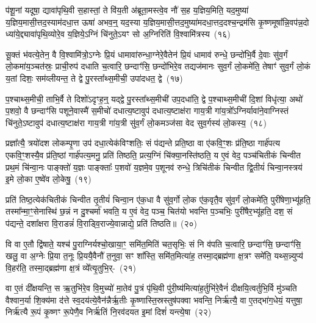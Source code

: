 प॑शू॒नां यदूषा॒ द्यावा॑\-पृथि॒वी स॒हास्तां॒ ते वि॑य॒ती अ॑ब्रूता॒मस्त्वे॒व नौ॑ स॒ह य॒ज्ञिय॒मिति॒ यद॒मुष्या॑ य॒ज्ञिय॒मासी॒त्तद॒\-स्याम॑दधा॒त्त ऊषा॑ अभव॒न्॒ यद॒स्या य॒ज्ञिय॒मासी॒त्तद॒मुष्या॑\-मदधा॒त्तद॒\-दश्च॒न्द्रम॑सि कृ॒ष्णमूषा᳚न्नि॒वप॑न्न॒दो ध्या॑ये॒द्द्यावा॑पृथि॒व्योरे॒व य॒ज्ञिये॒\-ऽग्निं चि॑नुते॒\-ऽयꣳ सो अ॒ग्निरिति॑ वि॒श्वामि॑त्रस्य~(१६)\ip

सू॒क्तं भ॑वत्ये॒तेन॒ वै वि॒श्वामि॑त्रो॒\-ऽग्नेः प्रि॒यं धामावा॑रुन्धा॒ग्नेरे॒वैतेन॑ प्रि॒यं धामाव॑ रुन्धे॒ छन्दो॑भि॒र्वै दे॒वाः सु॑व॒र्गं लो॒कमा॑य॒ञ्चत॑स्रः॒ प्राची॒रुप॑ दधाति च॒त्वारि॒ छन्दाꣳ॑सि॒ छन्दो॑भिरे॒व तद्यज॑मानः सुव॒र्गं लो॒कमे॑ति॒ तेषाꣳ॑ सुव॒र्गं लो॒कं य॒तां दिशः॒ सम॑व्लीयन्त॒ ते द्वे पु॒रस्ता᳚थ्स॒मीची॒ उपा॑दधत॒ द्वे~(१७)\ip

प॒श्चाथ्स॒मीची॒ ताभि॒र्वै ते दिशो॑\-ऽदृꣳह॒न्॒ यद्द्वे पु॒रस्ता᳚थ्स॒मीची॑ उप॒\-दधा॑ति॒ द्वे प॒श्चाथ्स॒मीची॑ दि॒शां विधृ॑त्या॒ अथो॑ प॒शवो॒ वै छन्दाꣳ॑सि पशूने॒वास्मै॑ स॒मीचो॑ दधात्य॒ष्टावुप॑ दधात्य॒ष्टाक्ष॑रा गाय॒त्री गा॑य॒त्रो᳚\-ऽग्निर्यावा॑ने॒वाग्निस्तं चि॑नुते॒\-ऽष्टावुप॑ दधात्य॒ष्टाक्ष॑रा गाय॒त्री गा॑य॒त्री सु॑व॒र्गं लो॒कमञ्ज॑सा वेद सुव॒र्गस्य॑ लो॒कस्य॒~(१८)\ip

प्रज्ञा᳚त्यै॒ त्रयो॑दश लोकम्पृ॒णा उप॑ दधा॒त्येक॑विꣳशतिः॒ सं प॑द्यन्ते प्रति॒ष्ठा वा ए॑कवि॒ꣳ॒शः प्र॑ति॒ष्ठा गार्\mbox{}ह॑पत्य एकवि॒ꣳ॒शस्यै॒व प्र॑ति॒ष्ठां गार्\mbox{}ह॑पत्य॒मनु॒ प्रति॑ तिष्ठति॒ प्रत्य॒ग्निं चि॑क्या॒नस्ति॑ष्ठति॒ य ए॒वं वेद॒ पञ्च॑चितीकं चिन्वीत प्रथ॒मं चि॑न्वा॒नः पाङ्क्तो॑ य॒ज्ञः पाङ्क्ताः᳚ प॒शवो॑ य॒ज्ञमे॒व प॒शूनव॑ रुन्धे॒ त्रिचि॑तीकं चिन्वीत द्वि॒तीयं॑ चिन्वा॒नस्त्रय॑ इ॒मे लो॒का ए॒ष्वे॑व लो॒केषु॒~(१९)\ip

प्रति॑ तिष्ठ॒त्येक॑चितीकं चिन्वीत तृ॒तीयं॑ चिन्वा॒न ए॑क॒धा वै सु॑व॒र्गो लो॒क ए॑क॒वृतै॒व सु॑व॒र्गं लो॒कमे॑ति॒ पुरी॑षेणा॒भ्यू॑हति॒ तस्मा᳚न्मा॒ꣳ॒सेनास्थि॑ छ॒न्नं न दु॒श्चर्मा॑ भवति॒ य ए॒वं वेद॒ पञ्च॒ चित॑यो भवन्ति प॒ञ्चभिः॒ पुरी॑षैर॒भ्यू॑हति॒ दश॒ सं प॑द्यन्ते॒ दशा᳚क्षरा वि॒राडन्नं॑ वि॒राड्वि॒राज्ये॒वान्नाद्ये॒ प्रति॑ तिष्ठति॥~(२०)\ip

{}

वि वा ए॒तौ द्वि॑षाते॒ यश्च॑ पु॒राग्निर्यश्चो॒खाया॒ꣳ॒ समि॑त॒मिति॑ चत॒सृभिः॒ सं नि व॑पति च॒त्वारि॒ छन्दाꣳ॑सि॒ छन्दाꣳ॑सि॒ खलु॒ वा अ॒ग्नेः प्रि॒या त॒नूः प्रि॒ययै॒वैनौ॑ त॒नुवा॒ सꣳ शा᳚स्ति॒ समि॑त॒मित्या॑ह॒ तस्मा॒द्ब्रह्म॑णा क्ष॒त्रꣳ समे॑ति॒ यथ्स॒न्न्युप्य॑ वि॒हर॑ति॒ तस्मा॒द्ब्रह्म॑णा क्ष॒त्रं व्ये᳚त्यृ॒तुभि॒र्-~(२१)\ip

वा ए॒तं दी᳚क्षयन्ति॒ स ऋ॒तुभि॑रे॒व वि॒मुच्यो॑ मा॒तेव॑ पु॒त्रं पृ॑थि॒वी पु॑री॒ष्य॑मित्या॑ह॒र्तुभि॑रे॒वैनं॑ दीक्षयि॒त्वर्तुभि॒र्वि मु॑ञ्चति वैश्वान॒र्या शि॒क्य॑मा द॑त्ते स्व॒दय॑त्ये॒वैन॑न्नैर्\mbox{}ऋ॒तीः कृ॒ष्णास्ति॒स्रस्तुष॑\-पक्वा भवन्ति॒ निर्\mbox{}ऋ॑त्यै॒ वा ए॒तद्भा॑ग॒धेयं॒ यत्तुषा॒ निर्\mbox{}ऋ॑त्यै रू॒पं कृ॒ष्णꣳ रू॒पेणै॒व निर्\mbox{}ऋ॑तिं नि॒रव॑दयत इ॒मां दिशं॑ यन्त्ये॒षा~(२२)\ip

